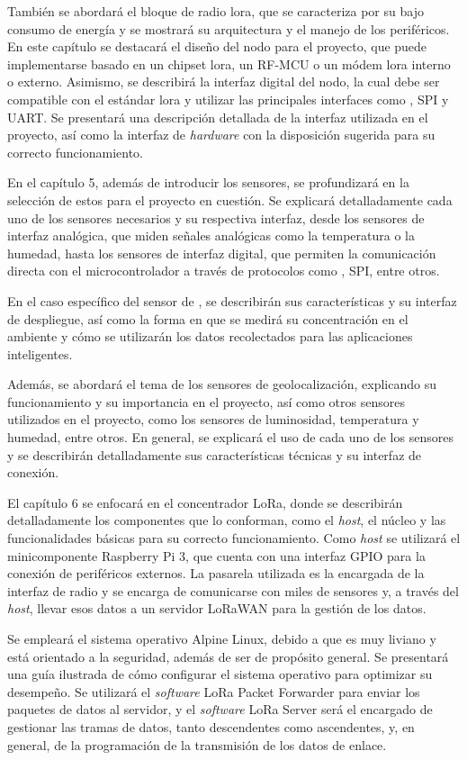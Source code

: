 También se abordará el bloque de radio \gls{lora}, que se caracteriza por su bajo consumo de energía y se mostrará su arquitectura y el manejo de los periféricos. En este capítulo se destacará el diseño del nodo para el proyecto, que puede implementarse basado en un chipset \gls{lora}, un RF-MCU o un módem \gls{lora} interno o externo. Asimismo, se describirá la interfaz digital del nodo, la cual debe ser compatible con el estándar \gls{lora} y utilizar las principales interfaces como \IC, SPI y UART. Se presentará una descripción detallada de la interfaz utilizada en el proyecto, así como la interfaz de \emph{hardware} con la disposición sugerida para su correcto funcionamiento.

En el capítulo 5, además de introducir los sensores, se profundizará en la selección de estos para el proyecto en cuestión. Se explicará detalladamente cada uno de los sensores necesarios y su respectiva interfaz, desde los sensores de interfaz analógica, que miden señales analógicas como la temperatura o la humedad, hasta los sensores de interfaz digital, que permiten la comunicación directa con el microcontrolador a través de protocolos como \IC, SPI, entre otros.

En el caso específico del sensor de \CO, se describirán sus características y su interfaz de despliegue, así como la forma en que se medirá su \mbox{concentración} en el ambiente y cómo se utilizarán los datos recolectados para las aplicaciones inteligentes. 

Además, se abordará el tema de los sensores de geolocalización, explicando su funcionamiento y su importancia en el proyecto, así como otros sensores utilizados en el proyecto, como los sensores de luminosidad, temperatura y humedad, entre otros. En general, se explicará el uso de cada uno de los sensores y se describirán detalladamente sus características técnicas y su interfaz de conexión.

El capítulo 6 se enfocará en el concentrador LoRa, donde se describirán detalladamente los componentes que lo conforman, como el \emph{host}, el núcleo y las funcionalidades básicas para su correcto funcionamiento. Como \emph{host} se utilizará el minicomponente Raspberry Pi 3, que cuenta con una interfaz GPIO para la conexión de periféricos externos. La pasarela utilizada es la encargada de la interfaz de radio y se encarga de comunicarse con miles de sensores y, a través del \emph{host}, llevar esos datos a un servidor LoRaWAN para la gestión de los datos.

Se empleará el sistema operativo Alpine Linux, debido a que es muy liviano y está orientado a la seguridad, además de ser de propósito general. Se presentará una guía ilustrada de cómo configurar el sistema operativo para optimizar su desempeño. Se utilizará el \emph{software} LoRa Packet Forwarder para enviar los paquetes de datos al servidor, y el \emph{software} LoRa Server será el encargado de gestionar las tramas de datos, tanto descendentes como ascendentes, y, en general, de la programación de la transmisión de los datos de enlace.

